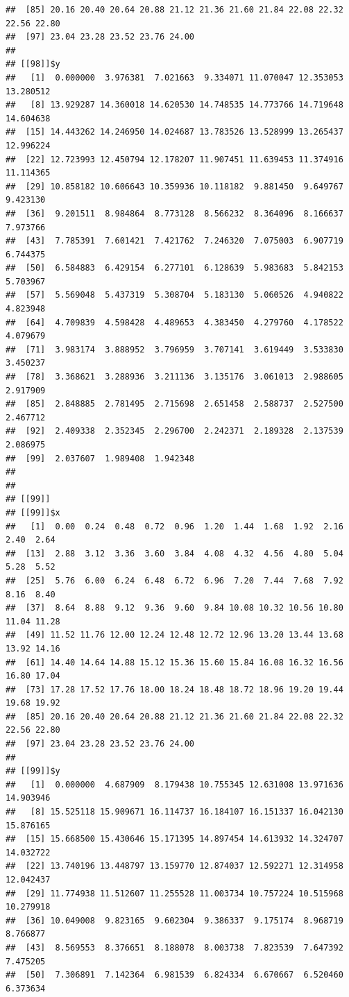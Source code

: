 \documentclass[
  ignorenonframetext,
]{beamer}
\begin{document}
\begin{frame}[fragile]{}
\begin{verbatim}
##  [85] 20.16 20.40 20.64 20.88 21.12 21.36 21.60 21.84 22.08 22.32 22.56 22.80
##  [97] 23.04 23.28 23.52 23.76 24.00
## 
## [[98]]$y
##   [1]  0.000000  3.976381  7.021663  9.334071 11.070047 12.353053 13.280512
##   [8] 13.929287 14.360018 14.620530 14.748535 14.773766 14.719648 14.604638
##  [15] 14.443262 14.246950 14.024687 13.783526 13.528999 13.265437 12.996224
##  [22] 12.723993 12.450794 12.178207 11.907451 11.639453 11.374916 11.114365
##  [29] 10.858182 10.606643 10.359936 10.118182  9.881450  9.649767  9.423130
##  [36]  9.201511  8.984864  8.773128  8.566232  8.364096  8.166637  7.973766
##  [43]  7.785391  7.601421  7.421762  7.246320  7.075003  6.907719  6.744375
##  [50]  6.584883  6.429154  6.277101  6.128639  5.983683  5.842153  5.703967
##  [57]  5.569048  5.437319  5.308704  5.183130  5.060526  4.940822  4.823948
##  [64]  4.709839  4.598428  4.489653  4.383450  4.279760  4.178522  4.079679
##  [71]  3.983174  3.888952  3.796959  3.707141  3.619449  3.533830  3.450237
##  [78]  3.368621  3.288936  3.211136  3.135176  3.061013  2.988605  2.917909
##  [85]  2.848885  2.781495  2.715698  2.651458  2.588737  2.527500  2.467712
##  [92]  2.409338  2.352345  2.296700  2.242371  2.189328  2.137539  2.086975
##  [99]  2.037607  1.989408  1.942348
## 
## 
## [[99]]
## [[99]]$x
##   [1]  0.00  0.24  0.48  0.72  0.96  1.20  1.44  1.68  1.92  2.16  2.40  2.64
##  [13]  2.88  3.12  3.36  3.60  3.84  4.08  4.32  4.56  4.80  5.04  5.28  5.52
##  [25]  5.76  6.00  6.24  6.48  6.72  6.96  7.20  7.44  7.68  7.92  8.16  8.40
##  [37]  8.64  8.88  9.12  9.36  9.60  9.84 10.08 10.32 10.56 10.80 11.04 11.28
##  [49] 11.52 11.76 12.00 12.24 12.48 12.72 12.96 13.20 13.44 13.68 13.92 14.16
##  [61] 14.40 14.64 14.88 15.12 15.36 15.60 15.84 16.08 16.32 16.56 16.80 17.04
##  [73] 17.28 17.52 17.76 18.00 18.24 18.48 18.72 18.96 19.20 19.44 19.68 19.92
##  [85] 20.16 20.40 20.64 20.88 21.12 21.36 21.60 21.84 22.08 22.32 22.56 22.80
##  [97] 23.04 23.28 23.52 23.76 24.00
## 
## [[99]]$y
##   [1]  0.000000  4.687909  8.179438 10.755345 12.631008 13.971636 14.903946
##   [8] 15.525118 15.909671 16.114737 16.184107 16.151337 16.042130 15.876165
##  [15] 15.668500 15.430646 15.171395 14.897454 14.613932 14.324707 14.032722
##  [22] 13.740196 13.448797 13.159770 12.874037 12.592271 12.314958 12.042437
##  [29] 11.774938 11.512607 11.255528 11.003734 10.757224 10.515968 10.279918
##  [36] 10.049008  9.823165  9.602304  9.386337  9.175174  8.968719  8.766877
##  [43]  8.569553  8.376651  8.188078  8.003738  7.823539  7.647392  7.475205
##  [50]  7.306891  7.142364  6.981539  6.824334  6.670667  6.520460  6.373634

\end{verbatim}
\end{frame}
\end{document}
